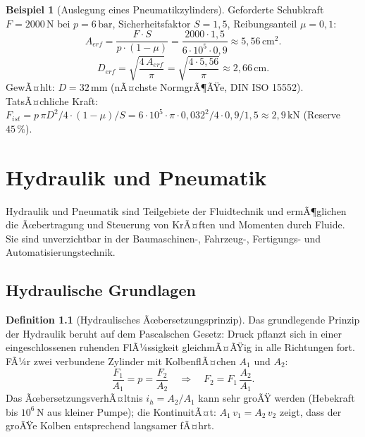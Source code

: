 ﻿\documentclass[a4paper,12pt]{report}
\theoremstyle{definition}
\newtheorem{definition}{Definition}
\newtheorem{beispiel}{Beispiel}
\begin{document}
\begin{beispiel}[Auslegung eines Pneumatikzylinders]
Geforderte Schubkraft $F = 2000\,\mathrm{N}$ bei $p = 6\,\mathrm{bar}$,
Sicherheitsfaktor $S = 1{,}5$, Reibungsanteil $\mu = 0{,}1$:
\[
  A_{erf} = \frac{F\cdot S}{p\cdot(1-\mu)} = \frac{2000\cdot1{,}5}{6\cdot10^5\cdot0{,}9}
  \approx 5{,}56\,\mathrm{cm^2}.
\]
\[
  D_{erf} = \sqrt{\frac{4\,A_{erf}}{\pi}} = \sqrt{\frac{4\cdot5{,}56}{\pi}} \approx 2{,}66\,\mathrm{cm}.
\]
GewÃ¤hlt: $D = 32\,\mathrm{mm}$ (nÃ¤chste NormgrÃ¶ÃŸe, DIN ISO 15552).
TatsÃ¤chliche Kraft: $F_{ist} = p\,\pi D^2/4\cdot(1-\mu)/S = 6\cdot10^5\cdot\pi\cdot0{,}032^2/4\cdot0{,}9/1{,}5
\approx 2{,}9\,\mathrm{kN}$ (Reserve $45\,\%$).
\end{beispiel}

\chapter{Hydraulik und Pneumatik}

Hydraulik und Pneumatik sind Teilgebiete der Fluidtechnik und
ermÃ¶glichen die Ãœbertragung und Steuerung von KrÃ¤ften und Momenten
durch Fluide. Sie sind unverzichtbar in der Baumaschinen-, Fahrzeug-,
Fertigungs- und Automatisierungstechnik.

\section{Hydraulische Grundlagen}

\begin{definition}[Hydraulisches Ãœbersetzungsprinzip]
Das grundlegende Prinzip der Hydraulik beruht auf dem
Pascalschen Gesetz: Druck pflanzt sich in einer eingeschlossenen
ruhenden FlÃ¼ssigkeit gleichmÃ¤ÃŸig in alle Richtungen fort.
FÃ¼r zwei verbundene Zylinder mit KolbenflÃ¤chen $A_1$ und $A_2$:
\[
  \frac{F_1}{A_1} = p = \frac{F_2}{A_2}
  \quad\Rightarrow\quad F_2 = F_1\,\frac{A_2}{A_1}.
\]
Das ÃœbersetzungsverhÃ¤ltnis $i_h = A_2/A_1$ kann sehr groÃŸ werden
(Hebekraft bis $10^6\,\mathrm{N}$ aus kleiner Pumpe);
die KontinuitÃ¤t: $A_1\,v_1 = A_2\,v_2$ zeigt, dass der
groÃŸe Kolben entsprechend langsamer fÃ¤hrt.
\end{definition}
\end{document}

